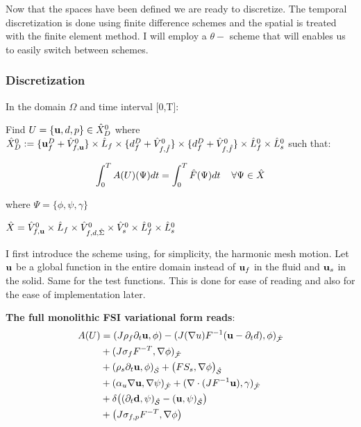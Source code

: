Now that the spaces have been defined we are ready to discretize. The temporal discretization is done using finite difference schemes and the spatial is treated with the finite element method. I will employ a $\theta-$ scheme that will enables us to easily switch between schemes.

\subsubsection{Discretization}

In the domain $\Omega$ and time interval [0,T]:

Find $ U = \{\bold{u}, d, p\} \in \hat{X}^0_D $ where $ \hat{X}^0_D := \{ \bold{u}^D_f + \hat{V}^0_{f,\bold{u}} \} \times \hat{L}_f \times \{ d_f^D + \hat{V}^0_{f,\hat{f}} \} \times \{ d_f^D + \hat{V}^0_{f,\hat{f}} \} \times \hat{L}^0_f \times \hat{L}^0_s  $ such that:

\begin{equation}
\int_0^T A(U)(\Psi) dt = \int_0^T \hat{F}(\Psi) dt \hspace{4mm} \forall  \Psi \in \hat{X}
\end{equation}

where $ \Psi = \{\phi, \psi, \gamma \} $%

 $\hat{X} = \hat{V}^0_{f,\bold{u}} \times \hat{L}_f \times \hat{V}^0_{f,d,\hat{\Sigma}} \times \hat{V}_s^0 \times \hat{L}_f^0 \times \hat{L}_s^0  $


I first introduce the scheme using, for simplicity, the harmonic mesh motion. Let $\bold{u}$ be a global function in the entire domain instead of $\bold{u}_f$ in the fluid and $\bold{u}_s$ in the solid. Same for the test functions. This is done for ease of reading and also for the ease of implementation later.

\textbf{The full monolithic FSI variational form reads}:
\begin{align}
A(U)&= (J \rho_f \partial_t \bold{u} , \phi ) - (J (\nabla u)F^{-1}(\bold{u} - \partial_t d) , \phi )_{\mathcal{\hat{F}}}  \\
       &+ ( J \sigma_{f} F^{-T} , \nabla \phi )_{\mathcal{\hat{F}}} \\
       &+ (\rho_s \partial_t \bold{u} , \phi)_{\mathcal{\hat{S}}}   + \big(F S_s, \nabla \phi \big)_{\mathcal{\hat{S}}} \\
       &+ ( \alpha_u \nabla \bold{u}, \nabla \psi)_{\mathcal{\hat{F}}} + (\nabla \cdot (J F^{-1} \bold{u}),\gamma )_{\mathcal{\hat{F}}} \\
       \label{eq:condition}
       &+ \delta\big((\partial_t \bold{d} , \psi)_{\mathcal{\hat{S}}}  - ( \bold{u} , \psi )_{\mathcal{\hat{S}}}\big) \\ 
       &+  \big( J \sigma_{f,p} F^{-T}, \nabla \phi  \big) 	 		
\end{align}

